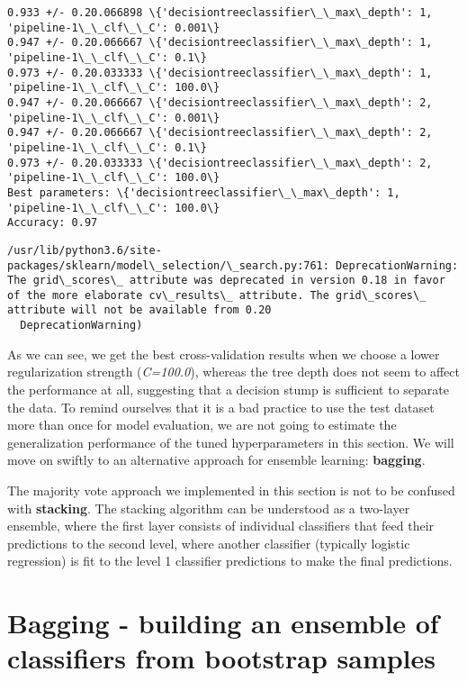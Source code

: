 \documentclass[11pt]{article}
\begin{document}
    \begin{Verbatim}[commandchars=\\\{\}]
0.933 +/- 0.20.066898 \{'decisiontreeclassifier\_\_max\_depth': 1, 'pipeline-1\_\_clf\_\_C': 0.001\}
0.947 +/- 0.20.066667 \{'decisiontreeclassifier\_\_max\_depth': 1, 'pipeline-1\_\_clf\_\_C': 0.1\}
0.973 +/- 0.20.033333 \{'decisiontreeclassifier\_\_max\_depth': 1, 'pipeline-1\_\_clf\_\_C': 100.0\}
0.947 +/- 0.20.066667 \{'decisiontreeclassifier\_\_max\_depth': 2, 'pipeline-1\_\_clf\_\_C': 0.001\}
0.947 +/- 0.20.066667 \{'decisiontreeclassifier\_\_max\_depth': 2, 'pipeline-1\_\_clf\_\_C': 0.1\}
0.973 +/- 0.20.033333 \{'decisiontreeclassifier\_\_max\_depth': 2, 'pipeline-1\_\_clf\_\_C': 100.0\}
Best parameters: \{'decisiontreeclassifier\_\_max\_depth': 1, 'pipeline-1\_\_clf\_\_C': 100.0\}
Accuracy: 0.97

    \end{Verbatim}

    \begin{Verbatim}[commandchars=\\\{\}]
/usr/lib/python3.6/site-packages/sklearn/model\_selection/\_search.py:761: DeprecationWarning: The grid\_scores\_ attribute was deprecated in version 0.18 in favor of the more elaborate cv\_results\_ attribute. The grid\_scores\_ attribute will not be available from 0.20
  DeprecationWarning)

    \end{Verbatim}

    As we can see, we get the best cross-validation results when we choose a
lower regularization strength (\emph{C=100.0}), whereas the tree depth
does not seem to affect the performance at all, suggesting that a
decision stump is sufficient to separate the data. To remind ourselves
that it is a bad practice to use the test dataset more than once for
model evaluation, we are not going to estimate the generalization
performance of the tuned hyperparameters in this section. We will move
on swiftly to an alternative approach for ensemble learning:
\textbf{bagging}.

The majority vote approach we implemented in this section is not to be
confused with \textbf{stacking}. The stacking algorithm can be
understood as a two-layer ensemble, where the first layer consists of
individual classifiers that feed their predictions to the second level,
where another classifier (typically logistic regression) is fit to the
level 1 classifier predictions to make the final predictions.

    \section{Bagging - building an ensemble of classifiers from bootstrap
samples}\label{bagging---building-an-ensemble-of-classifiers-from-bootstrap-samples}
\end{document}

